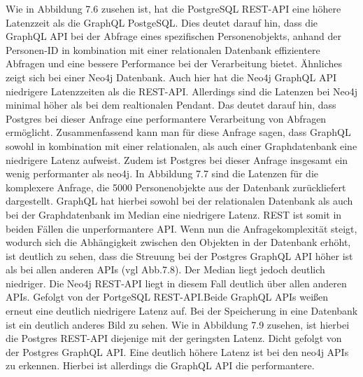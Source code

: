 \newline
\noindent
Wie in Abbildung 7.6 zusehen ist, hat die PostgreSQL REST-API eine höhere Latenzzeit als die GraphQL PostgeSQL. Dies deutet darauf hin, dass die GraphQL API bei der Abfrage eines spezifischen Personenobjekts, anhand der Personen-ID in kombination mit einer relationalen Datenbank effizientere Abfragen und eine bessere Performance bei der Verarbeitung bietet. Ähnliches zeigt sich bei einer Neo4j Datenbank. Auch hier hat die Neo4j GraphQL API niedrigere Latenzzeiten als die REST-API. Allerdings sind die Latenzen bei Neo4j minimal höher als bei dem realtionalen Pendant. Das deutet darauf hin, dass Postgres bei dieser Anfrage eine performantere Verarbeitung von Abfragen ermöglicht. Zusammenfassend kann man für diese Anfrage sagen, dass GraphQL sowohl in kombination mit einer relationalen, als auch einer Graphdatenbank eine niedrigere Latenz aufweist. Zudem ist Postgres bei dieser Anfrage insgesamt ein wenig performanter als neo4j.
\newline
In Abbildung 7.7 sind die Latenzen für die komplexere Anfrage, die 5000 Personenobjekte aus der Datenbank zurückliefert dargestellt. GraphQL hat hierbei sowohl bei der relationalen Datenbank als auch bei der Graphdatenbank im Median eine niedrigere Latenz. REST ist somit in beiden Fällen die unperformantere API.
\newline
Wenn nun die Anfragekomplexität steigt, wodurch sich die Abhängigkeit zwischen den Objekten in der Datenbank erhöht, ist deutlich zu sehen, dass die Streuung bei der Postgres GraphQL API höher ist als bei allen anderen APIs (vgl Abb.7.8). Der Median liegt jedoch deutlich niedriger. Die Neo4j REST-API liegt in diesem Fall deutlich über allen anderen APIs. Gefolgt von der PortgeSQL REST-API.Beide GraphQL APIs weißen erneut eine deutlich niedrigere Latenz auf.
\newline
Bei der Speicherung in eine Datenbank ist ein deutlich anderes Bild zu sehen. Wie in Abbildung 7.9 zusehen, ist hierbei die Postgres REST-API diejenige mit der geringsten Latenz. Dicht gefolgt von der Postgres GraphQL API. Eine deutlich höhere Latenz ist bei den neo4j APIs zu erkennen. Hierbei ist allerdings die GraphQL API die performantere.


